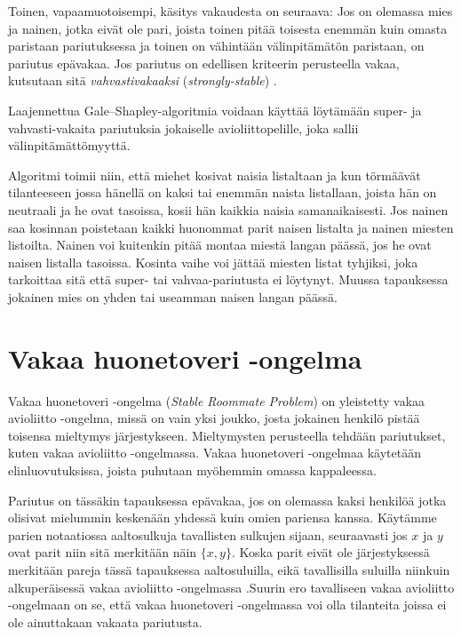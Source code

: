 \documentclass[finnish]{tktltiki2}
\theoremstyle{definition}
\theoremstyle{remark}
\begin{document}
Toinen, vapaamuotoisempi, käsitys vakaudesta on seuraava: Jos on olemassa mies ja nainen, jotka eivät ole pari, joista toinen pitää toisesta enemmän kuin omasta paristaan pariutuksessa ja toinen on vähintään välinpitämätön paristaan, on pariutus epävakaa. Jos pariutus on edellisen kriteerin perusteella vakaa, kutsutaan sitä \emph{vahvastivakaaksi} (\emph{strongly-stable}) \cite[s. 29]{gusfield1989stable}.

Laajennettua Gale--Shapley-algoritmia voidaan käyttää löytämään super- ja vahvasti-vakaita pariutuksia jokaiselle avioliittopelille, joka sallii välinpitämättömyyttä.

Algoritmi toimii niin, että miehet kosivat naisia listaltaan ja kun törmäävät tilanteeseen jossa hänellä on kaksi tai enemmän naista listallaan, joista hän on neutraali ja he ovat tasoissa, kosii hän kaikkia naisia samanaikaisesti. Jos nainen saa kosinnan poistetaan kaikki huonommat parit naisen listalta ja nainen miesten listoilta. Nainen voi kuitenkin pitää montaa miestä langan päässä, jos he ovat naisen listalla tasoissa. Kosinta vaihe voi jättää miesten listat tyhjiksi, joka tarkoittaa sitä että super- tai vahvaa-pariutusta ei löytynyt. Muussa tapauksessa jokainen mies on yhden tai useamman naisen langan päässä.

\section{Vakaa huonetoveri -ongelma}
Vakaa huonetoveri -ongelma (\emph{Stable Roommate Problem}) on yleistetty vakaa avioliitto -ongelma, missä on vain yksi joukko, josta jokainen henkilö pistää toisensa mieltymys järjestykseen. Mieltymysten perusteella tehdään pariutukset, kuten vakaa avioliitto -ongelmassa. Vakaa huonetoveri -ongelmaa käytetään elinluovutuksissa, joista puhutaan myöhemmin omassa kappaleessa.

Pariutus on tässäkin tapauksessa epävakaa, jos on olemassa kaksi henkilöä jotka olisivat mielummin keskenään yhdessä kuin omien pariensa kanssa. Käytämme parien notaatiossa aaltosulkuja tavallisten sulkujen sijaan, seuraavasti jos $x$ ja $y$ ovat parit niin sitä merkitään näin $\{x, y\}$. Koska parit eivät ole järjestyksessä merkitään pareja tässä tapauksessa aaltosuluilla, eikä tavallisilla suluilla niinkuin alkuperäisessä vakaa avioliitto -ongelmassa \cite[s. 163]{gusfield1989stable} .Suurin ero tavalliseen vakaa avioliitto -ongelmaan on se, että vakaa huonetoveri -ongelmassa voi olla tilanteita joissa ei ole ainuttakaan vakaata pariutusta.
\end{document}
